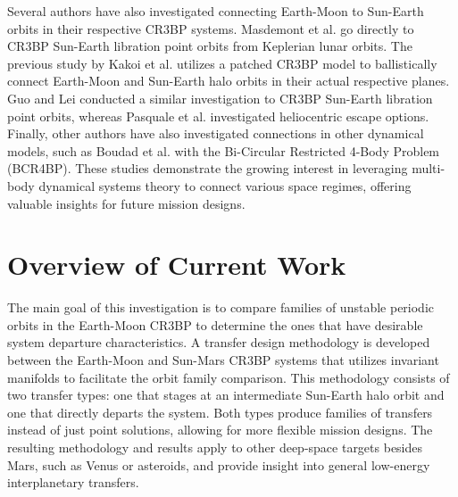 Several authors have also investigated connecting Earth-Moon to Sun-Earth orbits in their
respective CR3BP systems. Masdemont et al. go directly to CR3BP Sun-Earth libration point orbits
from Keplerian lunar orbits\cite{Masdemont:2021}. The previous study by Kakoi et al. utilizes a
patched CR3BP model to ballistically connect Earth-Moon and Sun-Earth halo orbits in their actual
respective planes\cite{Kakoi:2014}. Guo and Lei conducted a similar investigation to CR3BP
Sun-Earth libration point orbits\cite{Guo:2019}, whereas Pasquale et al. investigated heliocentric
escape options\cite{Pasquale:2021}. Finally, other authors have also investigated connections in
other dynamical models, such as Boudad et al. with the Bi-Circular Restricted 4-Body Problem
(BCR4BP)\cite{Boudad:2021}. These studies demonstrate the growing interest in leveraging multi-body
dynamical systems theory to connect various space regimes, offering valuable insights for future
mission designs.

\section{Overview of Current Work}\label{sec:Overview}
The main goal of this investigation is to compare families of unstable periodic orbits in the
Earth-Moon CR3BP to determine the ones that have desirable system departure characteristics. A
transfer design methodology is developed between the Earth-Moon and Sun-Mars CR3BP systems that
utilizes invariant manifolds to facilitate the orbit family comparison. This methodology consists
of two transfer types: one that stages at an intermediate Sun-Earth halo orbit and one that
directly departs the system. Both types produce families of transfers instead of just point
solutions, allowing for more flexible mission designs. The resulting methodology and results apply
to other deep-space targets besides Mars, such as Venus or asteroids, and provide insight into
general low-energy interplanetary transfers.

